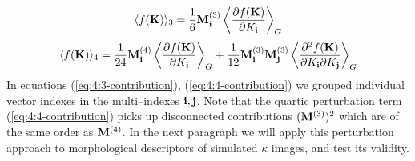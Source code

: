 \begin{equation}
\label{eq:4:3-contribution}
\langle f(\mathbf{K})\rangle_3 = \frac{1}{6}\mathbf{M}^{(3)}_{\mathbf{i}}\left\langle\frac{\partial f(\mathbf{K})}{\partial K_{\mathbf{i}}}\right\rangle_G
\end{equation}
%
\begin{equation}
\label{eq:4:4-contribution}
\langle f(\mathbf{K})\rangle_4 = \frac{1}{24}\mathbf{M}^{(4)}_{\mathbf{i}}\left\langle\frac{\partial f(\mathbf{K})}{\partial K_{\mathbf{i}}}\right\rangle_G+ \frac{1}{12}\mathbf{M}^{(3)}_{\mathbf{i}}\mathbf{M}^{(3)}_{\mathbf{j}}\left\langle\frac{\partial^2 f(\mathbf{K})}{\partial K_{\mathbf{i}}\partial K_{\mathbf{j}}}\right\rangle_G
\end{equation}
%
In equations (\ref{eq:4:3-contribution}), (\ref{eq:4:4-contribution}) we grouped individual vector indexes in the multi--indexes $\mathbf{i},\mathbf{j}$. Note that the quartic perturbation term (\ref{eq:4:4-contribution}) picks up disconnected contributions $(\mathbf{M}^{(3)})^2$ which are of the same order as $\mathbf{M}^{(4)}$. In the next paragraph we will apply this perturbation approach to morphological descriptors of simulated $\kappa$ images, and test its validity.   


